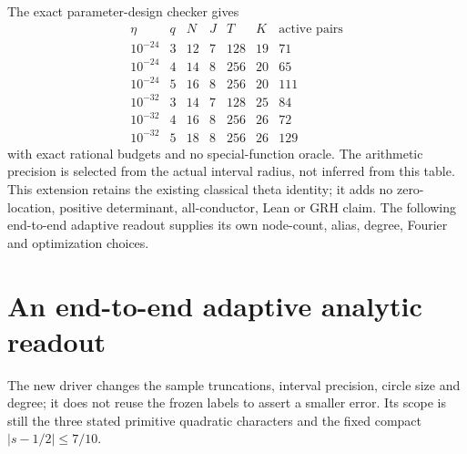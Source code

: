\documentclass[11pt,oneside,openany]{book}
\theoremstyle{definition}\newtheorem{definition}[theorem]{Definition}
\theoremstyle{remark}\newtheorem{remark}[theorem]{Remark}
\begin{document}
The exact parameter-design checker gives
\[
\begin{array}{c|c|rrrr|r}
\eta&q&N&J&T&K&\text{active pairs}\\\hline
10^{-24}&3&12&7&128&19&71\\
10^{-24}&4&14&8&256&20&65\\
10^{-24}&5&16&8&256&20&111\\
10^{-32}&3&14&7&128&25&84\\
10^{-32}&4&16&8&256&26&72\\
10^{-32}&5&18&8&256&26&129
\end{array}
\]
with exact rational budgets and no special-function oracle.
The arithmetic precision is selected from the actual interval radius,
not inferred from this table. This extension retains the existing
classical theta identity; it adds no zero-location, positive determinant,
all-conductor, Lean or GRH claim. The following end-to-end adaptive readout supplies its own node-count,
alias, degree, Fourier and optimization choices.

\section{An end-to-end adaptive analytic readout}\label{at:family}
The new driver changes the sample truncations, interval precision, circle
size and degree; it does not reuse the frozen labels to assert a smaller
error. Its scope is still the three stated primitive quadratic characters
and the fixed compact $|s-1/2|\le7/10$.
\end{document}
